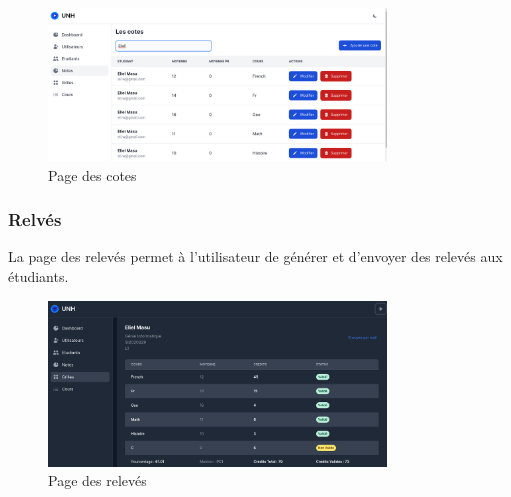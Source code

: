 \begin{figure}[ht]
  \centering
  \includegraphics[width=0.8\textwidth]{gfx/ui/grades-filter}
  \caption{Page des cotes}
  \label{fig:grades}
\end{figure}

\subsubsection*{Relvés}\label{subsec:releves}
La page des relevés permet à l'utilisateur de générer et d'envoyer des relevés aux étudiants.

\begin{figure}[ht]
  \centering
  \includegraphics[width=0.8\textwidth]{gfx/ui/personnal-grid}
  \caption{Page des relevés}
  \label{fig:reports}
\end{figure}

